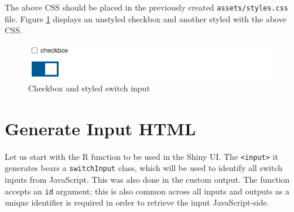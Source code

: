 \documentclass[10pt,]{krantz}
\makeatletter
\newenvironment{Shaded}{\begin{snugshade}}{\end{snugshade}}
\newcommand{\CommentTok}[1]{\textcolor[rgb]{0.37,0.37,0.37}{\textit{#1}}}
\newcommand{\ConstantTok}[1]{\textcolor[rgb]{0,0,0}{#1}}
\newcommand{\ControlFlowTok}[1]{\textcolor[rgb]{0.27,0.27,0.27}{\textbf{#1}}}
\newcommand{\DataTypeTok}[1]{\textcolor[rgb]{0.27,0.27,0.27}{#1}}
\newcommand{\DecValTok}[1]{\textcolor[rgb]{0.06,0.06,0.06}{#1}}
\newcommand{\FunctionTok}[1]{\textcolor[rgb]{0,0,0}{#1}}
\newcommand{\InformationTok}[1]{\textcolor[rgb]{0.37,0.37,0.37}{\textbf{\textit{#1}}}}
\newcommand{\KeywordTok}[1]{\textcolor[rgb]{0.27,0.27,0.27}{\textbf{#1}}}
\newcommand{\NormalTok}[1]{#1}
\newcommand{\OperatorTok}[1]{\textcolor[rgb]{0.43,0.43,0.43}{\textbf{#1}}}
\newcommand{\StringTok}[1]{\textcolor[rgb]{0.5,0.5,0.5}{#1}}
\newenvironment{kframe}{%
\medskip{}
\setlength{\fboxsep}{.8em}
 \def\at@end@of@kframe{}%
 \ifinner\ifhmode%
  \def\at@end@of@kframe{\end{minipage}}%
  \begin{minipage}{\columnwidth}%
 \fi\fi%
 \def\FrameCommand##1{\hskip\@totalleftmargin \hskip-\fboxsep
 \colorbox{shadecolor}{##1}\hskip-\fboxsep
     \hskip-\linewidth \hskip-\@totalleftmargin \hskip\columnwidth}%
 \MakeFramed {\advance\hsize-\width
   \@totalleftmargin\z@ \linewidth\hsize
   \@setminipage}}%
 {\par\unskip\endMakeFramed%
 \at@end@of@kframe}
\renewenvironment{Shaded}{\begin{kframe}}{\end{kframe}}
\makeatother
\begin{document}
\begin{Shaded}
\end{Shaded}

The above CSS should be placed in the previously created \texttt{assets/styles.css} file. Figure \ref{fig:checkbox-switch} displays an unstyled checkbox and another styled with the above CSS.

\begin{figure}[H]

{\centering \includegraphics[width=1\linewidth]{images/checkbox-switch} 

}

\caption{Checkbox and styled switch input}\label{fig:checkbox-switch}
\end{figure}

\hypertarget{shiny-input-html}{%
\section{Generate Input HTML}\label{shiny-input-html}}

Let us start with the R function to be used in the Shiny UI. The \texttt{\textless{}input\textgreater{}} it generates bears a \texttt{switchInput} class, which will be used to identify all switch inputs from JavaScript. This was also done in the custom output. The function accepts an \texttt{id} argument; this is also common across all inputs and outputs as a unique identifier is required in order to retrieve the input JavaScript-side.

\begin{Shaded}
\end{Shaded}
\end{document}
